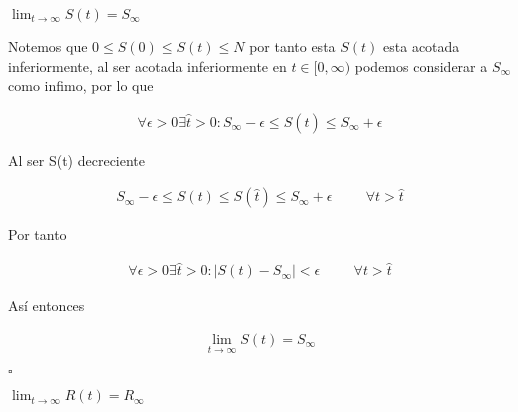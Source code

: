 \begin{Af}
$\lim_{t \to \infty} S(t) = S_{\infty}$
\end{Af}

\begin{Dem}
Notemos que  $0 \leq S(0) \leq S(t) \leq N$ por tanto esta $S(t)$ esta acotada inferiormente, al ser acotada inferiormente en $t \in [0, \infty)$ podemos considerar a $S_{\infty}$ como infimo, por lo que
 
 \begin{align*}
\forall \epsilon >0  \exists \hat{t} > 0 : S_{\infty} - \epsilon \leq S(\hat{t}) \leq S_{\infty} +  \epsilon
 \end{align*}
 
Al ser S(t) decreciente 

\begin{align*}
S_{\infty} - \epsilon \leq S(t) \leq S(\hat{t}) \leq S_{\infty} +  \epsilon  \hspace{1cm} \forall t  > \hat{t} 
\end{align*}

Por tanto 

\begin{align*}
\forall \epsilon > 0  \exists \hat{t} > 0 : |S(t) -  S_{\infty}| <  \epsilon \hspace{1cm} \forall t  > \hat{t} 
\end{align*}

Así entonces

\begin{align*}
\lim_{t \to \infty} S(t) = S_{\infty}
\end{align*}

\end{Dem}

\hfill	$\square$

\begin{Af}
$\lim_{t \to \infty} R(t) = R_{\infty}$
\end{Af}

